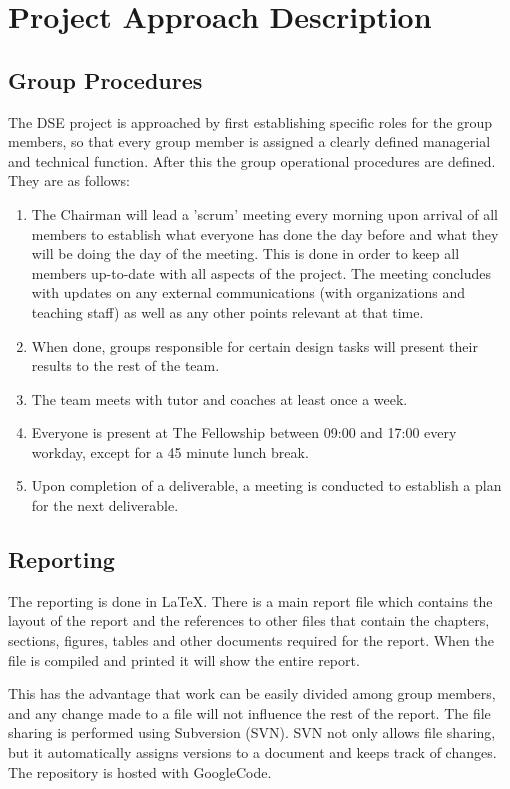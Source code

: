 \section{Project Approach Description}
\label{projectApproachDescription}
\subsection{Group Procedures}
The DSE project is approached by first establishing specific roles for the group members, so that every group member is assigned a clearly defined managerial and technical function. After this the group operational procedures are defined. They are as follows:

\begin{enumerate}
	\item The Chairman will lead a 'scrum' meeting every morning upon arrival of all members to establish what everyone has done the day before and what they will be doing the day of the meeting. This is done in order to keep all members up-to-date with all aspects of the project. The meeting concludes with updates on any external communications (with organizations and teaching staff) as well as any other points relevant at that time.
	\item When done, groups responsible for certain design tasks will present their results to the rest of the team.
	\item The team meets with tutor and coaches at least once a week.
	\item Everyone is present at The Fellowship between 09:00 and 17:00 every workday, except for a 45 minute lunch break.
	\item Upon completion of a deliverable, a meeting is conducted to establish a plan for the next deliverable.  
\end{enumerate}

\subsection{Reporting}
The reporting is done in \LaTeX. There is a main report file which contains the layout of the report and the references to other files that contain the chapters, sections, figures, tables and other documents required for the report. When the file is compiled and printed it will show the entire report.

This has the advantage that work can be easily divided among group members, and any change made to a file will not influence the rest of the report. The file sharing is performed using Subversion (SVN). SVN not only allows file sharing, but it automatically assigns versions to a document and keeps track of changes. The repository is hosted with Google\texttrademark Code.

